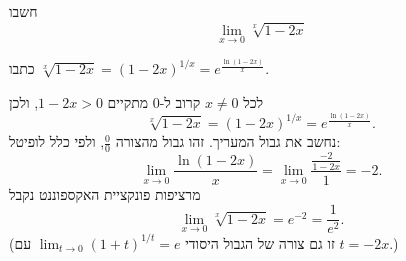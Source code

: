 
\begin{question}
חשבו
\[ \lim_{x\to0}\sqrt[x]{1-2x} \]
\end{question}

\begin{hint}
כתבו $\sqrt[x]{1-2x}=(1-2x)^{1/x}=e^{\frac{\ln(1-2x)}{x}}$.
\end{hint}

\begin{solution}
לכל $x\neq0$ קרוב ל-$0$ מתקיים $1-2x>0$, ולכן
\[ \sqrt[x]{1-2x}=(1-2x)^{1/x}=e^{\frac{\ln(1-2x)}{x}}. \]
נחשב את גבול המעריך. זהו גבול מהצורה $\frac00$, ולפי כלל לופיטל:
\[ \lim_{x\to0}\frac{\ln(1-2x)}{x}=\lim_{x\to0}\frac{\frac{-2}{1-2x}}{1}=-2. \]
מרציפות פונקציית האקספוננט נקבל
\[ \lim_{x\to0}\sqrt[x]{1-2x}=e^{-2}=\boxed{\frac1{e^2}}. \]
(זו גם צורה של הגבול היסודי $\lim_{t\to0}(1+t)^{1/t}=e$ עם $t=-2x$.)
\end{solution}
